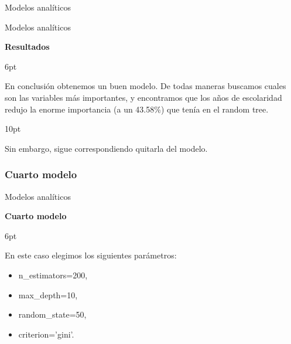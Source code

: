 \documentclass[pdf]{beamer}
\def\vspace{}%
\begin{document}
{\begin{frame}{Modelos analíticos}
\end{frame}

\begin{frame}{Modelos analíticos}

    \begin{Large}
        \textbf{Resultados}
    \end{Large}
    \vspace{6pt}

    En conclusión obtenemos un buen modelo. De todas maneras buscamos cuales son las variables más importantes, y encontramos que los años de escolaridad redujo la enorme importancia (a un 43.58\%) que tenía en el random tree. 
    
    \vspace{10pt}
    
    Sin embargo, sigue correspondiendo quitarla del modelo.

\end{frame}

\subsubsection{Cuarto modelo}

\begin{frame}{Modelos analíticos}

    \begin{Large}
        \textbf{Cuarto modelo}
    \end{Large}
    \vspace{6pt}

    En este caso elegimos los siguientes parámetros:
    \begin{itemize}
        \item n\_estimators=200,
        \item max\_depth=10,
        \item random\_state=50,
        \item criterion='gini'.
    \end{itemize}


\end{frame}}
\end{document}
